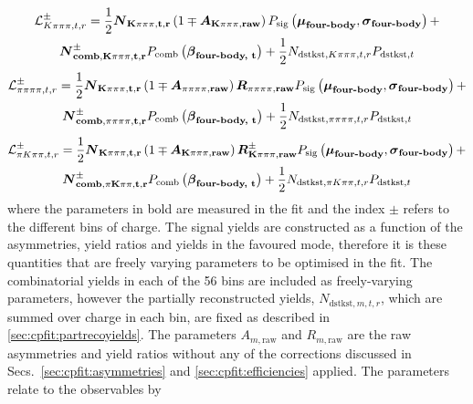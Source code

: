 \begin{multline}
\mathcal{L}_{K\pi\pi\pi, t, r}^{\pm} = \frac{1}{2}\mathbf{\boldsymbol N_{K\pi\pi\pi, t, r}}\left(1 \mp \mathbf{\boldsymbol A_{K\pi\pi\pi, raw}}\right)P_{\text{sig}}\left(\mathbf{\boldsymbol\mu_\text{\textbf{four-body}}},\mathbf{\boldsymbol\sigma_\text{\textbf{four-body}}}\right) + \\ \mathbf{\boldsymbol N_{\textbf{comb}, K\pi\pi\pi, t, r}^{\pm}}P_{\text{comb}}\left(\mathbf{\boldsymbol\beta_\text{\textbf{four-body, t}}}\right) + \frac{1}{2}N_{\text{dstkst}, K\pi\pi\pi, t, r}P_{\text{dstkst}, t}
\end{multline}
\begin{multline}
\mathcal{L}_{\pi\pi\pi\pi, t, r}^{\pm} = \frac{1}{2}\mathbf{\boldsymbol N_{K\pi\pi\pi, t, r}}\left(1 \mp \mathbf{\boldsymbol A_{\pi\pi\pi\pi, raw}}\right)\mathbf{\boldsymbol R_{\pi\pi\pi\pi, raw}} P_{\text{sig}}\left(\mathbf{\boldsymbol\mu_\text{\textbf{four-body}}},\mathbf{\boldsymbol\sigma_\text{\textbf{four-body}}}\right) + \\ \mathbf{\boldsymbol N_{\textbf{comb}, \pi\pi\pi\pi, t, r}^{\pm}}P_{\text{comb}}\left(\mathbf{\boldsymbol\beta_\text{\textbf{four-body, t}}}\right) + \frac{1}{2}N_{\text{dstkst}, \pi\pi\pi\pi, t, r}P_{\text{dstkst}, t}
\end{multline}
\begin{multline}
\mathcal{L}_{\pi K\pi\pi, t, r}^{\pm} = \frac{1}{2}\mathbf{\boldsymbol N_{K\pi\pi\pi, t, r}}\left(1 \mp \mathbf{\boldsymbol A_{K\pi\pi\pi, raw}}\right)\mathbf{\boldsymbol R_{K\pi\pi\pi, raw}^{\pm}} P_{\text{sig}}\left(\mathbf{\boldsymbol\mu_\text{\textbf{four-body}}},\mathbf{\boldsymbol\sigma_\text{\textbf{four-body}}}\right) + \\ \mathbf{\boldsymbol N_{\textbf{comb}, \pi K\pi\pi, t, r}^{\pm}}P_{\text{comb}}\left(\mathbf{\boldsymbol\beta_\text{\textbf{four-body, t}}}\right) + \frac{1}{2}N_{\text{dstkst}, \pi K\pi\pi, t, r}P_{\text{dstkst}, t}
\label{pikpipilikelihood}
\end{multline}
where the parameters in bold are measured in the fit and the index $\pm$ refers to the different bins of \B charge. The signal yields are constructed as a function of the asymmetries, yield ratios and yields in the favoured mode, therefore it is these quantities that are freely varying parameters to be optimised in the \CP fit. The combinatorial yields in each of the 56 bins are included as freely-varying parameters, however the partially reconstructed yields, $N_{\text{dstkst}, m, t, r}$, which are summed over charge in each bin, are fixed as described in \sect\ref{sec:cpfit:partrecoyields}. The parameters $A_{m, \text{raw}}$ and $R_{m, \text{raw}}$ are the raw asymmetries and yield ratios without any of the corrections discussed in Secs.~\ref{sec:cpfit:asymmetries} and \ref{sec:cpfit:efficiencies} applied. The parameters relate to the \CP observables by
